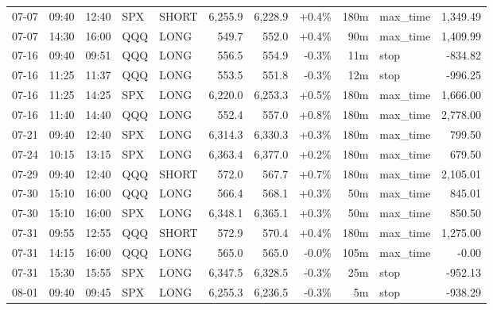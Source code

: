 \documentclass[11pt,a4paper,twoside]{article}
\begin{document}
\begin{center}
\begin{longtable}{>{\color{txtmain}}l l l l l r r r r >{\color{txtmain}}l r}
07-07 & 09:40 & 12:40 & SPX & SHORT & 6,255.9 & 6,228.9 & \textcolor{wingreen}{+0.4\%} & 180m & max\_time & \textcolor{wingreen}{1,349.49} \\
07-07 & 14:30 & 16:00 & QQQ & LONG & 549.7 & 552.0 & \textcolor{wingreen}{+0.4\%} & 90m & max\_time & \textcolor{wingreen}{1,409.99} \\
07-16 & 09:40 & 09:51 & QQQ & LONG & 556.5 & 554.9 & \textcolor{lossred}{-0.3\%} & 11m & stop & \textcolor{lossred}{-834.82} \\
07-16 & 11:25 & 11:37 & QQQ & LONG & 553.5 & 551.8 & \textcolor{lossred}{-0.3\%} & 12m & stop & \textcolor{lossred}{-996.25} \\
07-16 & 11:25 & 14:25 & SPX & LONG & 6,220.0 & 6,253.3 & \textcolor{wingreen}{+0.5\%} & 180m & max\_time & \textcolor{wingreen}{1,666.00} \\
07-16 & 11:40 & 14:40 & QQQ & LONG & 552.4 & 557.0 & \textcolor{wingreen}{+0.8\%} & 180m & max\_time & \textcolor{wingreen}{2,778.00} \\
07-21 & 09:40 & 12:40 & SPX & LONG & 6,314.3 & 6,330.3 & \textcolor{wingreen}{+0.3\%} & 180m & max\_time & \textcolor{wingreen}{799.50} \\
07-24 & 10:15 & 13:15 & SPX & LONG & 6,363.4 & 6,377.0 & \textcolor{wingreen}{+0.2\%} & 180m & max\_time & \textcolor{wingreen}{679.50} \\
07-29 & 09:40 & 12:40 & QQQ & SHORT & 572.0 & 567.7 & \textcolor{wingreen}{+0.7\%} & 180m & max\_time & \textcolor{wingreen}{2,105.01} \\
07-30 & 15:10 & 16:00 & QQQ & LONG & 566.4 & 568.1 & \textcolor{wingreen}{+0.3\%} & 50m & max\_time & \textcolor{wingreen}{845.01} \\
07-30 & 15:10 & 16:00 & SPX & LONG & 6,348.1 & 6,365.1 & \textcolor{wingreen}{+0.3\%} & 50m & max\_time & \textcolor{wingreen}{850.50} \\
07-31 & 09:55 & 12:55 & QQQ & SHORT & 572.9 & 570.4 & \textcolor{wingreen}{+0.4\%} & 180m & max\_time & \textcolor{wingreen}{1,275.00} \\
07-31 & 14:15 & 16:00 & QQQ & LONG & 565.0 & 565.0 & \textcolor{lossred}{-0.0\%} & 105m & max\_time & \textcolor{lossred}{-0.00} \\
07-31 & 15:30 & 15:55 & SPX & LONG & 6,347.5 & 6,328.5 & \textcolor{lossred}{-0.3\%} & 25m & stop & \textcolor{lossred}{-952.13} \\
08-01 & 09:40 & 09:45 & SPX & LONG & 6,255.3 & 6,236.5 & \textcolor{lossred}{-0.3\%} & 5m & stop & \textcolor{lossred}{-938.29} \\

\end{longtable}
\end{center}
\end{document}
